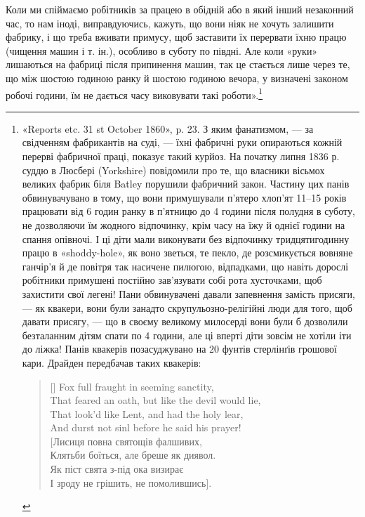 Коли ми спіймаємо робітників за працею в обідній або в який
інший незаконний час, то нам іноді, виправдуючись, кажуть,
що вони ніяк не хочуть залишити фабрику, і що треба вживати
примусу, щоб заставити їх перервати їхню працю (чищення машин
і т. ін.), особливо в суботу по півдні. Але коли «руки» лишаються
на фабриці після припинення машин, так це стається лише
через те, що між шостою годиною ранку й шостою годиною вечора,
у визначені законом робочі години, їм не дається часу виковувати
такі роботи».\footnote{
«Reports etc. 31 st October 1860», p. 23. З яким фанатизмом, — за
свідченням фабрикантів на суді, — їхні фабричні руки опираються кожній
перерві фабричної праці, показує такий курйоз. На початку липня 1836 р.
суддю в Люсбері (Yorkshire) повідомили про те, що власники вісьмох великих
фабрик біля Batley порушили фабричний закон. Частину цих панів
обвинувачувано в тому, що вони примушували п’ятеро хлоп’ят 11--15 років
працювати від 6 годин ранку в п’ятницю до 4 години після полудня
в суботу, не дозволяючи їм жодного відпочинку, крім часу на їжу й однієї
години на спання опівночі. І ці діти мали виконувати без відпочинку тридцятигодинну
працю в «shoddy-hole», як воно зветься, те пекло, де розсмикується
вовняне ганчір’я й де повітря так насичене пилюгою, відпадками,
що навіть дорослі робітники примушені постійно зав’язувати собі рота
хусточками, щоб захистити свої легені! Пани обвинувачені давали запевнення
замість присяги, — як квакери, вони були занадто скрупульозно-релігійні
люди для того, щоб давати присягу, — що в своєму великому
милосерді вони були б дозволили безталанним дітям спати по 4 години,
але ці вперті діти зовсім не хотіли іти до ліжка! Панів квакерів
позасуджувано на 20 фунтів стерлінґів грошової кари. Драйден передбачав
таких квакерів:
\settowidth{\versewidth}{That feared an oath, but like the devil would lie,} 
\begin{verse}[\versewidth]
Fox full fraught in seeming sanctity,\\
That feared an oath, but like the devil would lie,\\
That look’d like Lent, and had the holy lear,\\
And durst not sinl before he said his prayer! \\
[Лисиця повна святощів фалшивих,\\
Клятьби боїться, але бреше як диявол.\\
Як піст свята з-під ока визирає\\
І зроду не грішить, не помолившись].\\
\end{verse}
}

